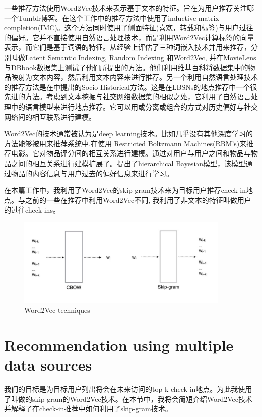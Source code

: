 \documentclass[UTF8]{ctexart}
\begin{document}
	一些推荐方法\cite{shin2014recommending,musto1441word}使用Word2Vec技术来表示基于文本的特征。\cite{shin2014recommending}旨在为用户推荐关注哪一个Tumblr博客。在这个工作中的推荐方法中使用了inductive matrix completion(IMC)。这个方法同时使用了侧面特征(喜欢，转载和标签)与用户过往的偏好。它并不直接使用自然语言处理技术，而是利用Word2Vec计算标签的向量表示，而它们是基于词语的特征。\cite{musto1441word}从经验上评估了三种词嵌入技术并用来推荐，分别叫做Latent Semantic Indexing, Random Indexing 和Word2Vec, 并在MovieLens与DBbook数据集上测试了他们所提出的方法。他们利用维基百科将数据集中的物品映射为文本内容，然后利用文本内容来进行推荐。另一个利用自然语言处理技术的推荐方法是在\cite{gao2012exploring}中提出的Socio-Historical方法。这是在LBSNs的地点推荐中一个很先进的方法。考虑到文本挖掘与社交网络数据集的相似之处，它利用了自然语言处理中的语言模型来进行地点推荐。它可以用或分离或组合的方式对历史偏好与社交网络间的相互联系进行建模。
	
	Word2Vec的技术通常被认为是deep learning技术。比如\cite{salakhutdinov2007restricted,georgiev2013non,wang2015collaborative}几乎没有其他深度学习的方法能够被用来推荐系统中.在\cite{salakhutdinov2007restricted}使用 Restricted Boltzmann Machines(RBM's)来推荐电影。它对物品评分间的相互关系进行建模。\cite{georgiev2013non}通过对用户与用户之间和物品与物品之间的相互关系进行建模扩展了\cite{salakhutdinov2007restricted}。\cite{wang2015collaborative}提出了hierarchical Bayesian模型，该模型通过物品的内容信息与用户过去的偏好信息来进行学习。
	
	在本篇工作中，我利用了Word2Vec的skip-gram技术来为目标用户推荐check-in地点。与之前的一些在推荐中利用Word2Vec\cite{shin2014recommending,musto1441word}不同, 我利用了非文本的特征叫做用户的过往check-ins。
	\begin{figure}
		\begin{center}
			\includegraphics[width=4in]{1}
		\end{center}
		\caption{Word2Vec techniques}
	\end{figure}
	
	
	\section{Recommendation using multiple data sources}
	我们的目标是为目标用户列出将会在未来访问的top-k check-in地点。为此我使用了叫做的skip-gram的Word2Vec技术。在本节中，我将会简短介绍Word2Vec技术并解释了在check-in推荐中如何利用了skip-gram技术。
	
\end{document}
